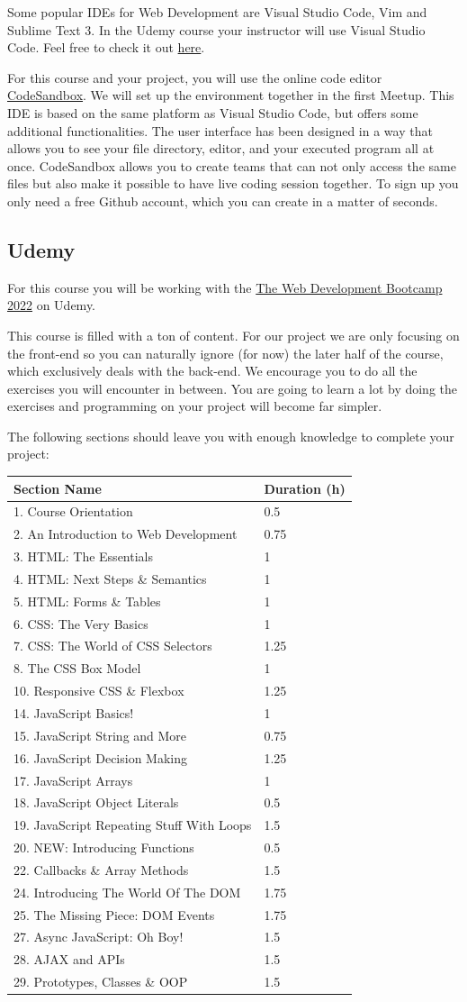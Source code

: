 \documentclass[
]{article}
\begin{document}
Some popular IDEs for Web Development are Visual Studio Code, Vim and Sublime Text 3. In the Udemy course your instructor will use Visual Studio Code. Feel free to check it out \href{https://code.visualstudio.com/}{here}.

For this course and your project, you will use the online code editor \href{https://codesandbox.io/}{CodeSandbox}. We will set up the environment together in the first Meetup. This IDE is based on the same platform as Visual Studio Code, but offers some additional functionalities. The user interface has been designed in a way that allows you to see your file directory, editor, and your executed program all at once. CodeSandbox allows you to create teams that can not only access the same files but also make it possible to have live coding session together. To sign up you only need a free Github account, which you can create in a matter of seconds.

\hypertarget{udemy}{%
\subsection{Udemy}\label{udemy}}

For this course you will be working with the \href{https://www.udemy.com/course/the-web-developer-bootcamp/}{The Web Development Bootcamp 2022} on Udemy.

This course is filled with a ton of content. For our project we are only focusing on the front-end so you can naturally ignore (for now) the later half of the course, which exclusively deals with the back-end. We encourage you to do all the exercises you will encounter in between. You are going to learn a lot by doing the exercises and programming on your project will become far simpler.

The following sections should leave you with enough knowledge to complete your project:

\begin{longtable}[]{@{}ll@{}}
\toprule
Section Name & Duration (h)\tabularnewline
\midrule
\endhead
1. Course Orientation & 0.5\tabularnewline
2. An Introduction to Web Development & 0.75\tabularnewline
3. HTML: The Essentials & 1\tabularnewline
4. HTML: Next Steps \& Semantics & 1\tabularnewline
5. HTML: Forms \& Tables & 1\tabularnewline
6. CSS: The Very Basics & 1\tabularnewline
7. CSS: The World of CSS Selectors & 1.25\tabularnewline
8. The CSS Box Model & 1\tabularnewline
10. Responsive CSS \& Flexbox & 1.25\tabularnewline
14. JavaScript Basics! & 1\tabularnewline
15. JavaScript String and More & 0.75\tabularnewline
16. JavaScript Decision Making & 1.25\tabularnewline
17. JavaScript Arrays & 1\tabularnewline
18. JavaScript Object Literals & 0.5\tabularnewline
19. JavaScript Repeating Stuff With Loops & 1.5\tabularnewline
20. NEW: Introducing Functions & 0.5\tabularnewline
22. Callbacks \& Array Methods & 1.5\tabularnewline
24. Introducing The World Of The DOM & 1.75\tabularnewline
25. The Missing Piece: DOM Events & 1.75\tabularnewline
27. Async JavaScript: Oh Boy! & 1.5\tabularnewline
28. AJAX and APIs & 1.5\tabularnewline
29. Prototypes, Classes \& OOP & 1.5\tabularnewline
\bottomrule
\end{longtable}
\end{document}
